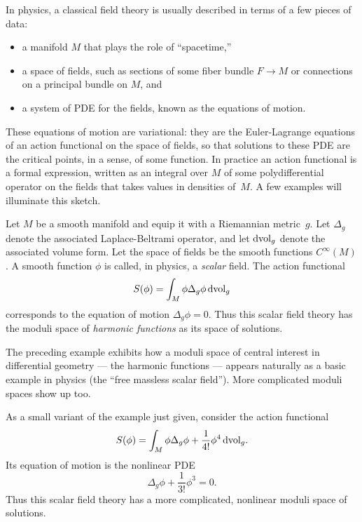 \documentclass[11pt]{amsart}
\begin{document}
In physics, a classical field theory is usually described in terms of a few pieces of data:
\begin{itemize}
\item a manifold $M$ that plays the role of ``spacetime,''
\item a space of fields, such as sections of some fiber bundle $F \to M$ or connections on a principal bundle on $M$, and
\item a system of PDE for the fields, known as the equations of motion.
\end{itemize}
These equations of motion are variational: 
they are the Euler-Lagrange equations of an action functional on the space of fields,
so that solutions to these PDE are the critical points, in a sense, of some function.
In practice an action functional is a formal expression, 
written as an integral over $M$ of some polydifferential operator on the fields that takes values in densities of~$M$.
A few examples will illuminate this sketch.

\begin{eg}
\label{eg: massless scalar}
Let $M$ be a smooth manifold and equip it with a Riemannian metric~$g$.
Let $\Delta_g$ denote the associated Laplace-Beltrami operator, 
and let ${\rm d}{\rm vol}_g$ denote the associated volume form.
Let the space of fields be the smooth functions $C^\infty(M)$.
A smooth function $\phi$ is called, in physics, a {\em scalar} field.
The action functional
\[
S(\phi) = \int_M \phi \Delta_g \phi \, {\rm d}{\rm vol}_g
\]
corresponds to the equation of motion $\Delta_g \phi = 0$. 
Thus this scalar field theory has the moduli space of {\em harmonic functions} as its space of solutions.
\end{eg}

The preceding example exhibits how a moduli space of central interest in differential geometry --- the harmonic functions --- appears naturally as a basic example in physics (the ``free massless scalar field'').
More complicated moduli spaces show up too.

\begin{eg}
As a small variant of the example just given,
consider the action functional
\[
S(\phi) = \int_M \phi \Delta_g \phi + \frac{1}{4!} \phi^4\, {\rm d}{\rm vol}_g.
\]
Its equation of motion is the nonlinear PDE 
\[
\Delta_g \phi + \frac{1}{3!} \phi^3 = 0.
\] 
Thus this scalar field theory has a more complicated, nonlinear moduli space of solutions.
\end{eg}
\end{document}
